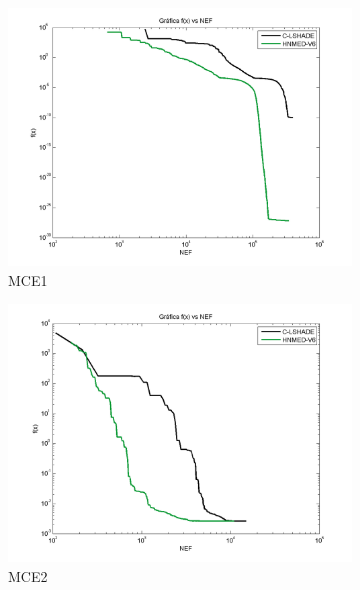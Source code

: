 \begin{figure}
	\centering
	\captionsetup{width=.85\linewidth}
	\begin{subfigure}[b]{0.49\linewidth}
		\includegraphics[width=\linewidth]{Figures/E-Grafica_Convergencia_Problema_1}
		\caption{MCE1} \label{fig:M1} 
	\end{subfigure}
	\begin{subfigure}[b]{0.49\linewidth}
		\includegraphics[width=\textwidth]{Figures/E-Grafica_Convergencia_Problema_2}
		\caption{MCE2} \label{fig:M2} 
	\end{subfigure}
	\begin{subfigure}[b]{0.49\linewidth}

\end{subfigure}
\end{figure}

